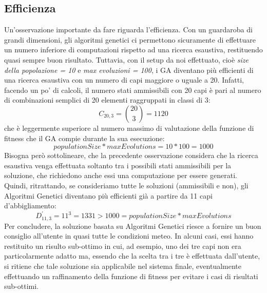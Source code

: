 \documentclass[a4paper, 11pt, oneside]{report}
\begin{document}
            \subsection{Efficienza}\label{subsec:efficienza}
            Un'osservazione importante da fare riguarda l'efficienza.
            Con un guardaroba di grandi dimensioni, gli algoritmi genetici
            ci permettono sicuramente di effettuare un numero inferiore di computazioni rispetto ad una ricerca esaustiva,
            restituendo quasi sempre buon risultato.
            Tuttavia, con il setup da noi effettuato, cioè \emph{size della popolazione = 10} e
            \emph{max evoluzioni = 100}, i GA diventano più efficienti di una ricerca esaustiva con un numero di capi
            maggiore o uguale a 20.
            Infatti, facendo un po' di calcoli, il numero stati ammissibili con 20 capi è pari al numero di combinazioni semplici
            di 20 elementi raggruppati in classi di 3:
            \begin{equation*}
                C_{20,3}=\binom{20}{3}= 1120
            \end{equation*}
            che è leggermente superiore al numero massimo di valutazione della funzione di fitness che il GA compie durante la sua esecuzione:
            \begin{equation*}
                populationSize * maxEvolutions = 10 * 100 = 1000
            \end{equation*}
            Bisogna però sottolineare, che la precedente osservazione considera che la ricerca esaustiva venga effettuata soltanto
            tra i possibili stati ammissibili per la soluzione, che richiedono anche essi una computazione per essere generati.
            Quindi, ritrattando, se consideriamo tutte le soluzioni (ammissibili e non), gli Algoritmi Genetici diventano più efficienti già a partire da
            11 capi d'abbigliamento:
            \begin{equation*}
                D_{11,3}^{'}=11^3 = 1331  > 1000 = populationSize * maxEvolutions
            \end{equation*}
            Per concludere, la soluzione basata su Algoritmi Genetici riesce a fornire un buon consiglio all'utente
            in quasi tutte le condizioni meteo.
            In alcuni casi, essi hanno restituito un risulto sub-ottimo in cui, ad esempio, uno dei tre capi non era
            particolarmente adatto ma, essendo che la scelta tra i tre è effettuata dall'utente, si ritiene che tale soluzione
            sia applicabile nel sistema finale, eventualmente effettuando un raffinamento della funzione di fitness per
            evitare i casi di risultati sub-ottimi.
\end{document}
